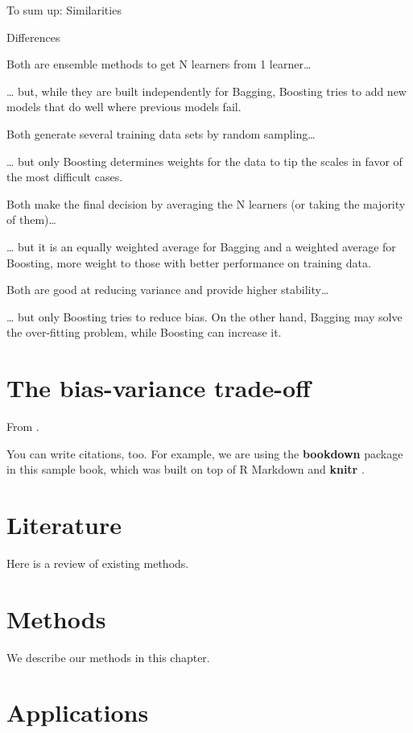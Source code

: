 \documentclass[]{book}
\theoremstyle{definition}
\theoremstyle{definition}
\theoremstyle{definition}
\theoremstyle{remark}
\begin{document}
To sum up: Similarities

Differences

Both are ensemble methods to get N learners from 1 learner\ldots{}

\ldots{} but, while they are built independently for Bagging, Boosting
tries to add new models that do well where previous models fail.

Both generate several training data sets by random sampling\ldots{}

\ldots{} but only Boosting determines weights for the data to tip the
scales in favor of the most difficult cases.

Both make the final decision by averaging the N learners (or taking the
majority of them)\ldots{}

\ldots{} but it is an equally weighted average for Bagging and a
weighted average for Boosting, more weight to those with better
performance on training data.

Both are good at reducing variance and provide higher stability\ldots{}

\ldots{} but only Boosting tries to reduce bias. On the other hand,
Bagging may solve the over-fitting problem, while Boosting can increase
it.

\chapter{The bias-variance trade-off}\label{the-bias-variance-trade-off}

From \citep{pythonDataScienceHandBook}.

You can write citations, too. For example, we are using the
\textbf{bookdown} package \citep{R-bookdown} in this sample book, which
was built on top of R Markdown and \textbf{knitr} \citep{xie2015}.

\chapter{Literature}\label{literature}

Here is a review of existing methods.

\chapter{Methods}\label{methods}

We describe our methods in this chapter.

\chapter{Applications}\label{applications}
\end{document}
